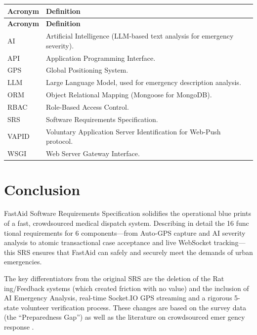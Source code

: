 \documentclass[12pt,a4paper]{article}
\begin{document}
\begin{longtable}{|p{2cm}|p{12cm}|}
\hline
\rowcolor{lightorange}
\textbf{Acronym} & \textbf{Definition} \\
\hline
\endfirsthead
\hline
\rowcolor{lightorange}
\textbf{Acronym} & \textbf{Definition} \\
\hline
\endhead

AI & Artificial Intelligence (LLM-based text analysis for emergency severity). \\
\hline
API & Application Programming Interface. \\
\hline
GPS & Global Positioning System. \\
\hline
LLM & Large Language Model, used for emergency description analysis. \\
\hline
ORM & Object Relational Mapping (Mongoose for MongoDB). \\
\hline
RBAC & Role-Based Access Control. \\
\hline
SRS & Software Requirements Specification. \\
\hline
VAPID & Voluntary Application Server Identification for Web-Push protocol. \\
\hline
WSGI & Web Server Gateway Interface. \\
\hline

\end{longtable}

\section{Conclusion}

FastAid Software Requirements Specification solidifies the operational blue prints of a fast, crowdsourced medical dispatch system. Describing in detail the 16 func tional requirements for 6 components---from Auto-GPS capture and AI severity analysis to atomic transactional case acceptance and live WebSocket tracking---this SRS ensures that FastAid can safely and securely meet the demands of urban emergencies.

The key differentiators from the original SRS are the deletion of the Rat ing/Feedback systems (which created friction with no value) and the inclusion of AI Emergency Analysis, real-time Socket.IO GPS streaming and a rigorous 5-state volunteer verification process. These changes are based on the survey data (the “Preparedness Gap”) as well as the literature on crowdsourced emer gency response \cite{zijlko2021, hasselqvist2015}.
\end{document}
